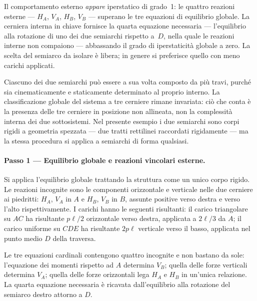\begin{oss}
	Il comportamento esterno \emph{appare} iperstatico
	di grado~1: le quattro reazioni esterne --- $H_A$,
	$V_A$, $H_B$, $V_B$ --- superano le tre equazioni
	di equilibrio globale. La cerniera interna in chiave
	fornisce la quarta equazione necessaria ---
	l'equilibrio alla rotazione di uno dei due semiarchi
	rispetto a~$D$, nella quale le reazioni interne
	non compaiono --- abbassando il grado di
	iperstaticità globale a zero. La scelta del semiarco
	da isolare è libera; in genere si preferisce quello
	con meno carichi applicati.
\end{oss}

\begin{oss}
	Ciascuno dei due semiarchi può essere a sua volta
	composto da più travi, purché sia cinematicamente
	e staticamente determinato al proprio interno.
	La classificazione globale del sistema a tre cerniere
	rimane invariata: ciò che conta è la presenza delle
	tre cerniere in posizione non allineata, non la
	complessità interna dei due sottosistemi.
	Nel presente esempio i due semiarchi sono corpi
	rigidi a geometria spezzata --- due tratti rettilinei
	raccordati rigidamente --- ma la stessa procedura
	si applica a semiarchi di forma qualsiasi.
\end{oss}


\paragraph{Passo 1 --- Equilibrio globale e	reazioni vincolari esterne.}

Si applica l'equilibrio globale trattando la struttura
come un unico corpo rigido.
Le reazioni incognite sono le componenti orizzontale e
verticale nelle due cerniere ai piedritti:
$H_A$, $V_A$ in $A$ e $H_B$, $V_B$ in $B$,
assunte positive verso destra e verso l'alto rispettivamente.
I carichi hanno le seguenti risultanti:
il carico triangolare su $AC$ ha risultante
$p\ell/2$ orizzontale verso destra,
applicata a $2\ell/3$ da $A$;
il carico uniforme su $CDE$ ha risultante $2p\ell$
verticale verso il basso,
applicata nel punto medio $D$ della traversa.

Le tre equazioni cardinali contengono quattro incognite
e non bastano da sole: l'equazione dei momenti rispetto
ad $A$ determina $V_B$; quella delle forze verticali
determina $V_A$; quella delle forze orizzontali lega
$H_A$ e $H_B$ in un'unica relazione. La quarta equazione
necessaria è ricavata dall'equilibrio alla rotazione
del semiarco destro attorno a $D$.

